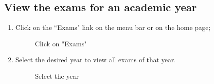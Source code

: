 \documentclass[ManualeUtente]{subfiles}
\begin{document}
	\subsection{View the exams for an academic year}
	\begin{enumerate}
		\item Click on the \textquotedblleft Exams" link on the menu bar or on the home page;
		\begin{figure}[H]
			\centering
			\caption{Click on "Exams"}
			\label{fig:Click on "Exams"}
		\end{figure}
		\item Select the desired year to view all exams of that year.
		\begin{figure}[H]
			\centering
			\caption{Select the year}
			\label{fig:Select the year}
		\end{figure}
	\end{enumerate}
\end{document}
